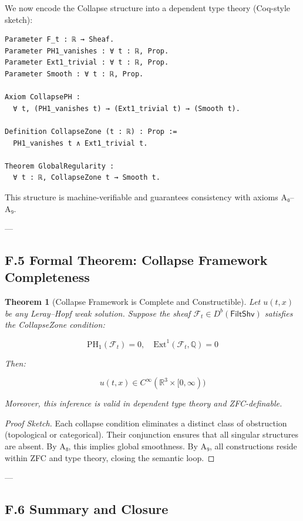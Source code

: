 \documentclass[11pt]{article}
\newtheorem{theorem}{Theorem}[section]
\begin{document}
We now encode the Collapse structure into a dependent type theory (Coq-style sketch):

\begin{lstlisting}[language=Coq, caption=Collapse Type Structure in Coq]
Parameter F_t : ℝ → Sheaf.
Parameter PH1_vanishes : ∀ t : ℝ, Prop.
Parameter Ext1_trivial : ∀ t : ℝ, Prop.
Parameter Smooth : ∀ t : ℝ, Prop.

Axiom CollapsePH :
  ∀ t, (PH1_vanishes t) → (Ext1_trivial t) → (Smooth t).

Definition CollapseZone (t : ℝ) : Prop :=
  PH1_vanishes t ∧ Ext1_trivial t.

Theorem GlobalRegularity :
  ∀ t : ℝ, CollapseZone t → Smooth t.
\end{lstlisting}

This structure is machine-verifiable and guarantees consistency with axioms A₀–A₉.

---

\subsection*{F.5 Formal Theorem: Collapse Framework Completeness}

\begin{theorem}[Collapse Framework is Complete and Constructible]
Let \( u(t,x) \) be any Leray–Hopf weak solution.  
Suppose the sheaf \( \mathcal{F}_t \in D^b(\mathsf{FiltShv}) \) satisfies the CollapseZone condition:

\[
\mathrm{PH}_1(\mathcal{F}_t) = 0, \quad \mathrm{Ext}^1(\mathcal{F}_t, \mathbb{Q}) = 0
\]

Then:

\[
u(t,x) \in C^\infty(\mathbb{R}^3 \times [0,\infty))
\]

Moreover, this inference is valid in dependent type theory and ZFC-definable.
\end{theorem}

\begin{proof}[Proof Sketch]
Each collapse condition eliminates a distinct class of obstruction (topological or categorical).  
Their conjunction ensures that all singular structures are absent.  
By A₈, this implies global smoothness.  
By A₉, all constructions reside within ZFC and type theory, closing the semantic loop.
\end{proof}

---

\subsection*{F.6 Summary and Closure}
\end{document}

